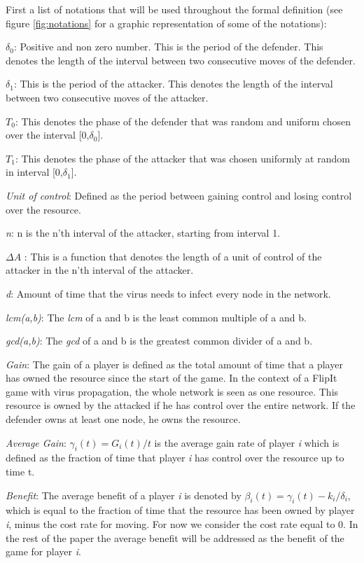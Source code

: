 First a list of notations that will be used throughout the formal definition (see figure \ref{fig:notations} for a graphic representation of some of the notations):
\begin{description}
\item $\delta_{0}$: Positive and non zero number. This is the period of the defender. This denotes the length of the interval between two consecutive moves of the defender. 
\item $\delta_{1}$: This is the period of the attacker. This denotes the length of the interval between two consecutive moves of the attacker.
\item \textit{$T_{0}$}: This denotes the phase of the defender that was random and uniform chosen over the interval [0,$\delta_{0}$].
\item \textit{$T_{1}$}: This denotes the phase of the attacker that was chosen uniformly at random in interval [0,$\delta_{1}$].
\item \textit{Unit of control}: Defined as the period between gaining control and losing control over the resource.  
\item \textit{n}: n is the n'th interval of the attacker, starting from interval 1.
\item $\Delta A$ : This is a function that denotes the length of a unit of control of the attacker in the n'th interval of the attacker.
\item \textit{d}: Amount of time that the virus needs to infect every node in the network.
\item \textit{lcm(a,b)}: The \textit{lcm} of a and b is the least common multiple of a and b.
\item \textit{gcd(a,b)}: The \textit{gcd} of a and b is the greatest common divider of a and b.
\item \textit{Gain}:  The gain of a player is defined as the total amount of time that a player has owned the resource since the start of the game. In the context of a FlipIt game with virus propagation, the whole network is seen as one resource. This resource is owned by the attacked if he has control over the entire network. If the defender owns at least one node, he owns the resource.\\
\item \textit{Average Gain}:  $\gamma_{i}(t) = G_{i}(t)/t$ is the average gain rate of player \textit{i} which is defined as the fraction of time that player \textit{i} has control over the resource up to time t.
\item \textit{Benefit}: The average benefit of a player \textit{i} is denoted by $\beta_{i}(t) = \gamma_{i}(t) - k_{i} / \delta_{i}$, which is equal to the fraction of time that the resource has been owned by player \textit{i}, minus the cost rate for moving. For now we consider the cost rate equal to 0. In the rest of the paper the average benefit will be addressed as the benefit of the game for player \textit{i}.
\end{description}
